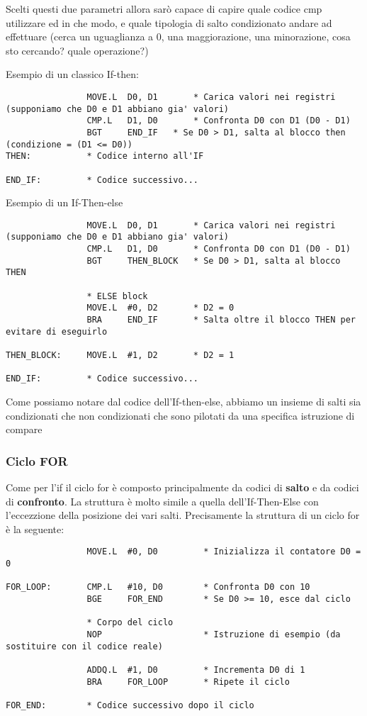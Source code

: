 Scelti questi due parametri allora sarò capace di capire quale codice cmp utilizzare ed in che modo, e quale tipologia di salto condizionato andare ad effettuare (cerca un uguaglianza a 0, una maggiorazione, una minorazione, cosa sto cercando? quale operazione?)

Esempio di un classico If-then:
\begin{lstlisting}
                MOVE.L  D0, D1       * Carica valori nei registri (supponiamo che D0 e D1 abbiano gia' valori)
                CMP.L   D1, D0       * Confronta D0 con D1 (D0 - D1)
                BGT     END_IF   * Se D0 > D1, salta al blocco then (condizione = (D1 <= D0))
THEN:           * Codice interno all'IF

END_IF:         * Codice successivo...
\end{lstlisting}

Esempio di un If-Then-else
\begin{lstlisting}
                MOVE.L  D0, D1       * Carica valori nei registri (supponiamo che D0 e D1 abbiano gia' valori)
                CMP.L   D1, D0       * Confronta D0 con D1 (D0 - D1)
                BGT     THEN_BLOCK   * Se D0 > D1, salta al blocco THEN

                * ELSE block
                MOVE.L  #0, D2       * D2 = 0
                BRA     END_IF       * Salta oltre il blocco THEN per evitare di eseguirlo

THEN_BLOCK:     MOVE.L  #1, D2       * D2 = 1

END_IF:         * Codice successivo...
\end{lstlisting}

Come possiamo notare dal codice dell'If-then-else, abbiamo un insieme di salti sia condizionati che non condizionati che sono pilotati da una specifica istruzione di compare

\subsubsection{Ciclo FOR}
Come per l'if il ciclo for è composto principalmente da codici di \textbf{salto} e da codici di \textbf{confronto}. La struttura è molto simile a quella dell'If-Then-Else con l'eccezzione della posizione dei vari salti.
Precisamente la struttura di un ciclo for è la seguente:
\begin{lstlisting}
                MOVE.L  #0, D0         * Inizializza il contatore D0 = 0

FOR_LOOP:       CMP.L   #10, D0        * Confronta D0 con 10
                BGE     FOR_END        * Se D0 >= 10, esce dal ciclo

                * Corpo del ciclo
                NOP                    * Istruzione di esempio (da sostituire con il codice reale)

                ADDQ.L  #1, D0         * Incrementa D0 di 1
                BRA     FOR_LOOP       * Ripete il ciclo

FOR_END:        * Codice successivo dopo il ciclo

\end{lstlisting}

